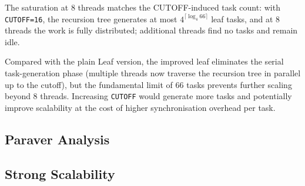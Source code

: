 \begin{sloppypar}
The saturation at 8 threads matches the CUTOFF-induced task count: with \texttt{CUTOFF=16},
the recursion tree generates at most $4^{\lceil\log_4 66\rceil}$ leaf tasks, and at 8
threads the work is fully distributed; additional threads find no tasks and remain idle.
\end{sloppypar}

Compared with the plain Leaf version, the improved leaf eliminates the serial
task-generation phase (multiple threads now traverse the recursion tree in parallel up
to the cutoff), but the fundamental limit of 66 tasks prevents further scaling beyond
8 threads.
Increasing \texttt{CUTOFF} would generate more tasks and potentially improve scalability
at the cost of higher synchronisation overhead per task.

\subsection{Paraver Analysis}
\label{sec:rec-improved-paraver}




\subsection{Strong Scalability}
\label{sec:rec-improved-scalability}



